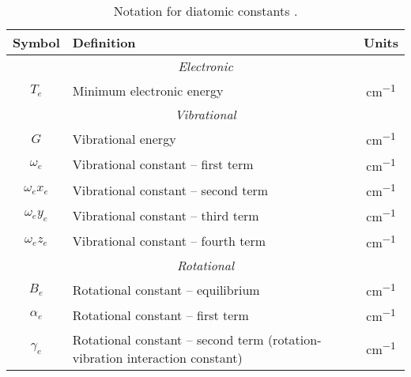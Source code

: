 \documentclass[11pt, twoside, fleqn]{report}
\begin{document}
    \begin{table}[H]
        \centering
        \caption{Notation for diatomic constants \cite{herzberg:diatomic,nist:sigma1,nist:sigma3}.}
        \label{t:notation}
        \begin{tabular}{clc}
            \toprule
            Symbol            & Definition                                                                   & Units            \\
            \midrule
            \multicolumn{3}{c}{\textit{Electronic}}                                                                             \\
            \cmidrule(lr){1-3}
            $T_{e}$           & Minimum electronic energy                                                    & \unit{cm^{-1}}   \\
            \multicolumn{3}{c}{\textit{Vibrational}}                                                                            \\
            \cmidrule(lr){1-3}
            $G$               & Vibrational energy                                                           & \unit{cm^{-1}}   \\
            $\omega_{e}$      & Vibrational constant -- first term                                           & \unit{cm^{-1}}   \\
            $\omega_{e}x_{e}$ & Vibrational constant -- second term                                          & \unit{cm^{-1}}   \\
            $\omega_{e}y_{e}$ & Vibrational constant -- third term                                           & \unit{cm^{-1}}   \\
            $\omega_{e}z_{e}$ & Vibrational constant -- fourth term                                          & \unit{cm^{-1}}   \\
            \multicolumn{3}{c}{\textit{Rotational}}                                                                             \\
            \cmidrule(lr){1-3}
            $B_{e}$           & Rotational constant -- equilibrium                                           & \unit{cm^{-1}}   \\
            $\alpha_{e}$      & Rotational constant -- first term                                            & \unit{cm^{-1}}   \\
            $\gamma_{e}$      & Rotational constant -- second term (rotation-vibration interaction constant) & \unit{cm^{-1}}   \\

\end{tabular}
\end{table}
\end{document}
